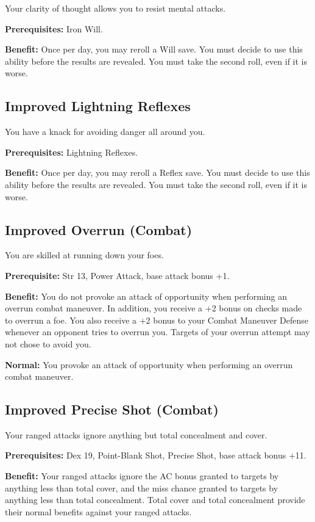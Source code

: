 				
Your clarity of thought allows you to resist mental attacks.
				
\textbf{Prerequisites:} Iron Will.
				
\textbf{Benefit:} Once per day, you may reroll a Will save. You must decide to use this ability before the results are revealed. You must take the second roll, even if it is worse.
				
\subsection{Improved Lightning Reflexes}

				
You have a knack for avoiding danger all around you.
				
\textbf{Prerequisites:} Lightning Reflexes.
				
\textbf{Benefit:} Once per day, you may reroll a Reflex save. You must decide to use this ability before the results are revealed. You must take the second roll, even if it is worse.
				
\subsection{Improved Overrun (Combat)}

				
You are skilled at running down your foes.
				
\textbf{Prerequisite:} Str 13, Power Attack, base attack bonus +1.
				
\textbf{Benefit:} You do not provoke an attack of opportunity when performing an overrun combat maneuver. In addition, you receive a +2 bonus on checks made to overrun a foe. You also receive a +2 bonus to your Combat Maneuver Defense whenever an opponent tries to overrun you. Targets of your overrun attempt may not chose to avoid you.
				
\textbf{Normal:} You provoke an attack of opportunity when performing an overrun combat maneuver.
				
\subsection{Improved Precise Shot (Combat)}

				
Your ranged attacks ignore anything but total concealment and cover.
				
\textbf{Prerequisites:} Dex 19, Point-Blank Shot, Precise Shot, base attack bonus +11.
				
\textbf{Benefit:} Your ranged attacks ignore the AC bonus granted to targets by anything less than total cover, and the miss chance granted to targets by anything less than total concealment. Total cover and total concealment provide their normal benefits against your ranged attacks.
				
